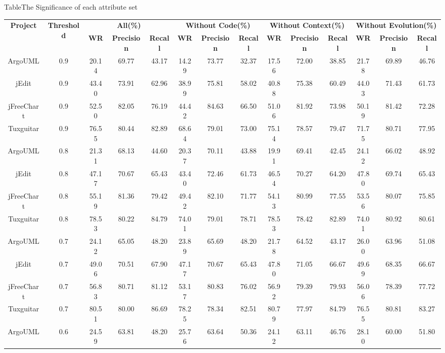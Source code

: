 \begin{table}[htbp]
{Table$\!$}{The Significance of each attribute set}
\vspace{0.5em}\centering\wuhao
\begin{tabular}{cccccccccccccc}
\toprule[1.5pt]
\multirow{2}{*}{\textbf{Project}}&\multirow{2}{*}{\textbf{Threshold}}&\multicolumn{3}{c}{\textbf{All(\%)}}&\multicolumn{3}{c}{\textbf{Without Code(\%)}}&\multicolumn{3}{c}{\textbf{Without Context(\%)}}&\multicolumn{3}{c}{\textbf{Without Evolution(\%)}}\\
\cline{3-14}
&&\textbf{WR}&\textbf{Precision}&\textbf{Recall}&\textbf{WR}&\textbf{Precision}&\textbf{Recall}&\textbf{WR}&\textbf{Precision}&\textbf{Recall}&\textbf{WR}&\textbf{Precision}&\textbf{Recall}\\
\midrule[1pt]
ArgoUML&0.9&20.14&	69.77&	43.17&14.29&	73.77&	32.37&17.56&	72.00&	38.85&21.78&	69.89&	46.76\\
jEdit&0.9&	43.40&	73.91&	62.96&	38.99&	75.81&	58.02&	40.88&	75.38&	60.49&	44.03&	71.43&	61.73\\
jFreeChart&0.9&	52.50&	82.05&	76.19&	44.42&	84.63&	66.50&	51.06&	81.92&	73.98&	50.19&	81.42&	72.28\\
Tuxguitar&0.9&	76.55&	80.44&	82.89&	68.64&	79.01&	73.00&	75.14&	78.57&	79.47&	71.75&	80.71&	77.95\\
ArgoUML&0.8&	21.31&	68.13&	44.60&	20.37&	70.11&	43.88&	19.91&	69.41&	42.45&	24.12&	66.02&	48.92\\
jEdit&0.8&	47.17&	70.67&	65.43&	43.40&	72.46&	61.73&	46.54&	70.27&	64.20&	47.80&	69.74&	65.43\\
jFreeChart&0.8&	55.19&	81.36&	79.42&	49.42&	82.10&	71.77&	54.13&	80.99&	77.55&	53.56&	80.07&	75.85\\
Tuxguitar&0.8&	78.53&	80.22&	84.79&	74.01&	79.01&	78.71&	78.53&	78.42&	82.89&	74.01&	80.92&	80.61\\
ArgoUML&0.7&	24.12&	65.05&	48.20&	23.89&	65.69&	48.20&	21.78&	64.52&	43.17&	26.00&	63.96&	51.08\\
jEdit&0.7&	49.06&	70.51&	67.90&	47.17&	70.67&	65.43&	47.80&	71.05&	66.67&	49.69&	68.35&	66.67\\
jFreeChart&0.7&	56.83&	80.71&	81.12&	53.17&	80.83&	76.02&	56.92&	79.39&	79.93&	56.06&	78.39&	77.72\\
Tuxguitar&0.7&	80.51&	80.00&	86.69&	78.25&	78.34&	82.51&	80.79&	77.97&	84.79&	76.55&	80.81&	83.27\\
ArgoUML&0.6&	24.59&	63.81&	48.20&	25.76&	63.64&	50.36&	24.12&	63.11&	46.76&	28.10&	60.00&	51.80\\

\end{tabular}
\end{table}
